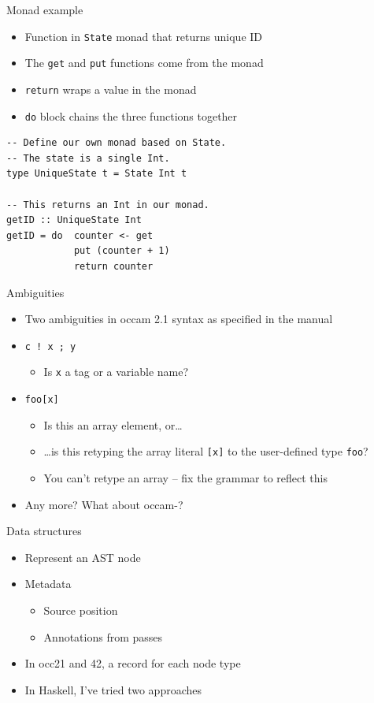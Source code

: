 \documentclass[adam,pdf,slideColor]{prosper}
\def\occampi{{occam-\Pisymbol{psy}{112}}\xspace}
\begin{document}
\begin{slide}{Monad example}
\begin{itemize}
\item Function in \verb|State| monad that returns unique ID
\item The \verb|get| and \verb|put| functions come from the monad
\item \verb|return| wraps a value in the monad
\item \verb|do| block chains the three functions together
\end{itemize}
\begin{verbatim}
-- Define our own monad based on State.
-- The state is a single Int.
type UniqueState t = State Int t

-- This returns an Int in our monad.
getID :: UniqueState Int
getID = do  counter <- get
            put (counter + 1)
            return counter
\end{verbatim}
\end{slide}

\begin{slide}{Ambiguities}
\begin{itemize}
\item Two ambiguities in occam 2.1 syntax as specified in the
  manual
\item \verb|c ! x ; y|
\begin{itemize}
\item Is \verb|x| a tag or a variable name?
\end{itemize}
\item \verb|foo[x]|
\begin{itemize}
\item Is this an array element, or\ldots
\item \ldots is this retyping the array literal \verb|[x]| to the
  user-defined type \verb|foo|?
\item You can't retype an array -- fix the grammar to reflect this
\end{itemize}
\item Any more? What about \occampi?
\end{itemize}
\end{slide}

\begin{slide}{Data structures}
\begin{itemize}
\item Represent an AST node
\item Metadata
\begin{itemize}
\item Source position
\item Annotations from passes
\end{itemize}
\item In occ21 and 42, a record for each node type
\item In Haskell, I've tried two approaches
\end{itemize}
\end{slide}
\end{document}
